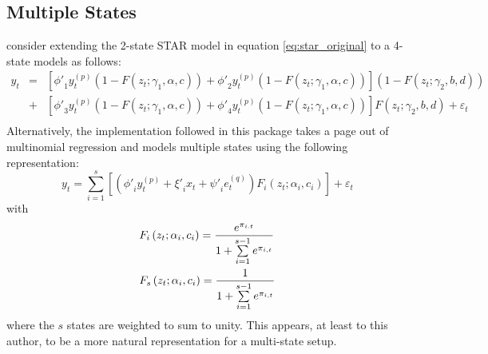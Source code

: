 \subsection{Multiple States}
\cite{Dijk1999} consider extending the 2-state STAR model in equation
\ref{eq:star_original} to a 4-state models as follows:
\begin{equation}\label{eq:mrstar_original}
\begin{aligned}
{y_t} &=& \left[ {{{\phi '}_1}y_t^{\left( p \right)}\left( {1 - F\left(
{{z_t};{\gamma _1},\alpha ,c} \right)} \right) + {{\phi '}_2}y_t^{\left( p
\right)}\left( {1 - F\left( {{z_t};{\gamma _1},\alpha ,c} \right)} \right)}
\right]\left( {1 - F\left( {{z_t};{\gamma _2},b,d} \right)} \right)\\
&+& \left[ {{{\phi '}_3}y_t^{\left( p \right)}\left( {1 - F\left(
{{z_t};{\gamma _1},\alpha ,c} \right)} \right) + {{\phi '}_4}y_t^{\left( p \right)}\left( {1 -
F\left( {{z_t};{\gamma _1},\alpha ,c} \right)} \right)} \right]F\left(
{{z_t};{\gamma _2},b,d} \right) + {\varepsilon _t}\\
\end{aligned}
\end{equation}
Alternatively, the implementation followed in this package takes a
page out of multinomial regression and models multiple states using the
following representation:
\begin{equation}\label{eq:mrstar_new}
{y_t} = \sum\limits_{i = 1}^s {\left[ {\left( {{{\phi '}_i}y_t^{\left( p \right)} + {{\xi '}_i}{x_t} + {{\psi '}_i}e_t^{\left( q \right)}} \right){F_i}\left( {{z_t};{\alpha _i},{c_i}} \right)} \right]}  + {\varepsilon _t}
\end{equation}
with
\begin{equation}
\begin{gathered}
  {F_i}\left( {{z_t};{\alpha _i},{c_i}} \right) = \frac{{{e^{{\pi _{i.t}}}}}}
{{1 + \sum\limits_{i = 1}^{s - 1} {{e^{{\pi _{i,t}}}}} }} \hfill \\
  {F_s}\left( {{z_t};{\alpha _i},{c_i}} \right) = \frac{1}
{{1 + \sum\limits_{i = 1}^{s - 1} {{e^{{\pi _{i,t}}}}} }} \hfill \\ 
\end{gathered}
\end{equation}
where the $s$ states are weighted to sum to unity. This appears, at least to
this author, to be a more natural representation for a multi-state setup.

